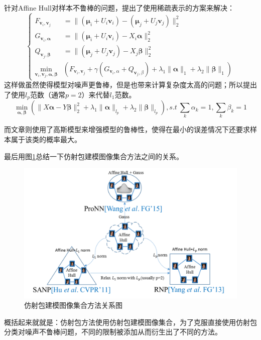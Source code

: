 针对Affine Hull对样本不鲁棒的问题，\cite{Affinehull_SANP}提出了使用稀疏表示的方案来解决：
\begin{equation}
\left\{
\begin{split}
\label{affinehull_SANP}
F_{\bm{v}_i,\bm{v}_j}&=\|(\bm{\mu}_i+U_i \bm{v}_i)-(\bm{\mu}_j+U_j \bm{v}_j)\|_{2}^{2}\\
G_{\bm{v}_i,\bm{\alpha}}&=\|(\bm{\mu}_i+U_i \bm{v}_i)-X_i \bm{\alpha}\|_{2}^{2}\\
Q_{\bm{v}_j,\bm{\beta}}&=\|(\bm{\mu}_j+U_j \bm{v}_j)-X_j \bm{\beta}\|_{2}^{2}\\
\min_{\bm{v}_i,\bm{v}_j,\bm{\alpha},\bm{\beta}}&(F_{\bm{v}_i,\bm{v}_j}+\gamma(G_{\bm{v}_i,\alpha}+Q_{\bm{v}_j,\beta})+\lambda_1 \|\bm{\alpha}\|_1+\lambda_2 \|\bm{\beta}\|_1)
\end{split}
\right.
\end{equation}
这样做虽然使得模型对噪声更鲁棒，但是也带来计算复杂度太高的问题；所以\cite{Affinehull_RNP}提出了使用$l_p$范数（通常$p=2$）来代替$l_1$范数。
\begin{equation}
\label{affinehull_RNP}
\min_{\bm{\alpha},\bm{\beta}}\left(\|X\bm{\alpha}-Y\bm{\beta}\|_2^2+\lambda_1 \|\bm{\alpha}\|_{l_p}+\lambda_2 \|\bm{\beta}\|_{l_p}\right),s.t~\sum_{k}\alpha_k =1,\sum_k\beta_k =1
\end{equation}

而文章\cite{Affinehull_ProNN}则使用了高斯模型来增强模型的鲁棒性，使得在最小的误差情况下还要求样本属于该类的概率最大。

最后用图\ref{fig:Affinehull_relation}总结一下仿射包建模图像集合方法之间的关系。
\begin{figure}[h]
	\centering
	\includegraphics[width=0.7\linewidth]{source/Affinehull_relation.png}
	\caption{仿射包建模图像集合方法关系图}
	\label{fig:Affinehull_relation}
\end{figure}

概括起来就就是：仿射包方法使用仿射包建模图像集合，为了克服直接使用仿射包分类对噪声不鲁棒问题，不同的限制被添加从而衍生出了不同的方法。
